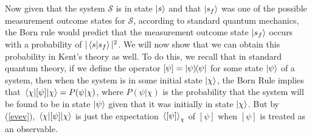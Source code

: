 \begin{comment}
But from time $t_f$ to $t_m$, we assume that the apparatus does get entangled with photons which are measured on $S\cap S_m$. Thus, if $\{\ket{\gamma_j^{\prime\prime}}:j\}$ are the normalized states representing the possible measurements outcomes of these photons such that $\ip{\gamma_j^{\prime\prime}}{\gamma_k^{\prime\prime}}\approx 0$ for $j\neq k$, then 
$$U_{S_m,S_f} U_{S_f,S_i}\ket{\Phi_{i}}\approx \sum_j c_j\ket{s_j}\ket{a_j}\ket*{\gamma_i^{(\mathcal{S})}}\ket*{\gamma_i^{(\mathcal{A})}}\sum_kg_k\ket{\gamma'_k}\ket{\gamma_j^{\prime\prime}}.$$
Since we are assuming that at time $t_m$ a measurement of photons on $S\cap S_m$ is able to determine that the apparatus is in state $\ket{a_f}$, this can only happen if $U_{S_m,S_f} U_{S_f,S_i}\ket{\Phi_{i}}$ is found to be in one of the states $\ket{\Phi_{k,f}}$ for some $k$ where
$$\ket{\Phi_{k,j}}=\ket{s_j}\ket{a_j}\ket*{\gamma_i^{(\mathcal{S})}}\ket*{\gamma_i^{(\mathcal{A})}}\ket{\gamma'_k}\ket{\gamma_j^{\prime\prime}}.$$
By the Born Rule, the probability $\ket{\Phi_i}$ will be found to be in state $\ket{\Phi_{k,j}}$ will be
$$\abs{\ip{\Phi_{k,j}}{\Phi_i}}=\abs{c_j}^2\abs{g_k}^2.$$
Therefore,
$$P(f|\ket{\Phi_i})=\sum_k \abs{\ip{\Phi_{k,f}}{\Phi_i}}=\abs{c_f}^2=\abs{\ip{s_f}{s}}^2.$$
Hence, the probability that a complete measurement of $T_S(x)$ on $S$ will give a measurement outcome of the particle being in state $\ket{s_f}$ given the partial measurement of $T_S(x)$ on $S_i\cap S$ determines the particle to be initially in the state $\ket{s}$ will be the same as the standard Born Rule probability $\abs{\ip{s_f}{s}}^2$ of $\ket{s}$ being found to be in state $\ket{s_f}$.

\end{comment}

Now given that the system $\mathcal{S}$ is in state $\ket{s}$ and that $\ket{s_f}$ was one of the possible measurement outcome states for $\mathcal{S}$, according to standard quantum mechanics, the Born rule would predict that the measurement outcome state $\ket{s_f}$ occurs with a probability of $|\ip{s}{s_f}|^2$. We will now show that we can obtain this probability in Kent's theory as well. To do this, we recall that in standard quantum theory, if  we define the operator $[\psi]=\dyad{\psi}$ for some state $\ket{\psi}$ of a system, then when the system is in some initial state $\ket{\chi}$, the Born Rule implies that $\ev{[\psi]}{\chi}=P(\psi|\chi)$, where $P(\psi|\chi)$ is the probability that the system will be found to be in state $\ket{\psi}$ given that it was initially in state $\ket{\chi}$. But by (\ref{evev}),  $\ev{[\psi]}{\chi}$ is just the expectation $\ev*{[\psi]}_\chi$ of $[\psi]$ when $[\psi]$ is treated as an observable. 

